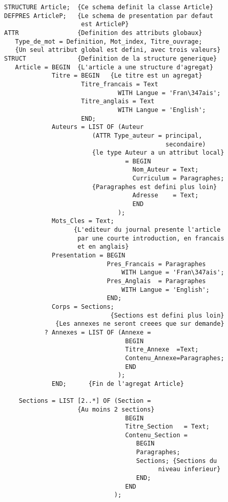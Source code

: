 {\begin{verbatim}
STRUCTURE Article;  {Ce schema definit la classe Article}
DEFPRES ArticleP;   {Le schema de presentation par defaut
                     est ArticleP}
ATTR                {Definition des attributs globaux}
   Type_de_mot = Definition, Mot_index, Titre_ouvrage;
   {Un seul attribut global est defini, avec trois valeurs}
STRUCT              {Definition de la structure generique}
   Article = BEGIN  {L'article a une structure d'agregat}
             Titre = BEGIN   {Le titre est un agregat}
                     Titre_francais = Text
                               WITH Langue = 'Fran\347ais';
                     Titre_anglais = Text
                               WITH Langue = 'English';
                     END;
             Auteurs = LIST OF (Auteur
                        (ATTR Type_auteur = principal,
                                            secondaire)
                        {le type Auteur a un attribut local}
                                 = BEGIN
                                   Nom_Auteur = Text;
                                   Curriculum = Paragraphes;
                        {Paragraphes est defini plus loin}
                                   Adresse    = Text;
                                   END
                               );
             Mots_Cles = Text;
                   {L'editeur du journal presente l'article
                    par une courte introduction, en francais
                    et en anglais}
             Presentation = BEGIN
                            Pres_Francais = Paragraphes
                                WITH Langue = 'Fran\347ais';
                            Pres_Anglais  = Paragraphes
                                WITH Langue = 'English';
                            END;
             Corps = Sections;
                             {Sections est defini plus loin}
              {Les annexes ne seront creees que sur demande}
           ? Annexes = LIST OF (Annexe =
                                 BEGIN
                                 Titre_Annexe  =Text;
                                 Contenu_Annexe=Paragraphes;
                                 END
                               );
             END;      {Fin de l'agregat Article}

    Sections = LIST [2..*] OF (Section =
                    {Au moins 2 sections}
                                 BEGIN
                                 Titre_Section   = Text;
                                 Contenu_Section =
                                    BEGIN
                                    Paragraphes;
                                    Sections; {Sections du
                                          niveau inferieur}
                                    END;
                                 END
                              );


\end{verbatim}}
